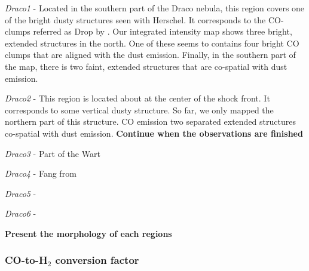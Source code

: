 \documentclass[traditabstract]{aa}
\begin{document}
\noindent \textit{Draco1} - Located in the southern part of the Draco nebula, this region covers one of the bright dusty structures seen with Herschel. It corresponds to the CO-clumps referred as Drop by \cite{Mebold_1985}. Our integrated intensity map shows three bright, extended structures in the north. One of these seems to contains four bright CO clumps that are aligned with the dust emission. Finally, in the southern part of the map, there is two faint, extended structures that are co-spatial with dust emission.
\medskip

\noindent \textit{Draco2} - This region is located about at the center of the shock front. It corresponds to some vertical dusty structure. So far, we only mapped the northern part of this structure. CO emission two separated extended structures co-spatial with dust emission. \textbf{Continue when the observations are finished}
\medskip

\noindent \textit{Draco3} - Part of the Wart
\medskip

\noindent \textit{Draco4} - Fang from \cite{Mebold_1985}
\medskip

\noindent \textit{Draco5} - 
\medskip

\noindent \textit{Draco6} - 

\textbf{Present the morphology of each regions}


      \subsubsection{CO-to-H$_2$ conversion factor}
\end{document}

